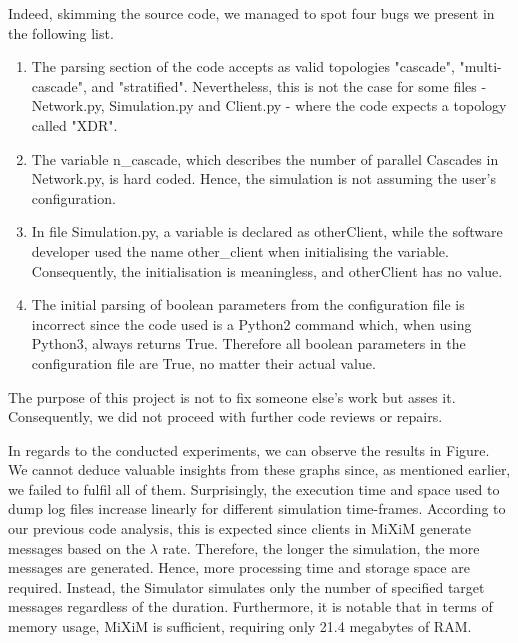 \documentclass[logo,msc,cyber]{infthesis}   %
\begin{document}
Indeed, skimming the source code, we managed to spot four bugs we present in the following list. 

\begin{enumerate}
    \item The parsing section of the code accepts as valid topologies "cascade",
    "multi-cascade", and "stratified". Nevertheless, this is not the case for
    some files - Network.py, Simulation.py and Client.py - where the code
    expects a topology called "XDR".
    \item The variable n\_cascade, which describes the number of parallel
    Cascades in Network.py, is hard coded. Hence, the simulation is not assuming
    the user's configuration.
    \item In file Simulation.py, a variable is declared as otherClient, while
    the software developer used the name other\_client when initialising the
    variable. Consequently, the initialisation is meaningless, and otherClient
    has no value.
    \item The initial parsing of boolean parameters from the configuration file
    is incorrect since the code used is a Python2 command which, when using
    Python3, always returns True. Therefore all boolean parameters in the
    configuration file are True, no matter their actual value.
\end{enumerate}

The purpose of this project is not to fix someone else's work but asses it.
Consequently, we did not proceed with further code reviews or repairs.

In regards to the conducted experiments, we can observe the results in Figure.
We cannot deduce valuable insights from these graphs since, as mentioned
earlier, we failed to fulfil all of them. Surprisingly, the execution time and
space used to dump log files increase linearly for different simulation
time-frames. According to our previous code analysis, this is expected since
clients in MiXiM generate messages based on the $\lambda$ rate. Therefore, the
longer the simulation, the more messages are generated. Hence, more processing
time and storage space are required. Instead, the Simulator simulates only the
number of specified target messages regardless of the duration. Furthermore, it
is notable that in terms of memory usage, MiXiM is sufficient, requiring only
21.4 megabytes of RAM. 
\end{document}
